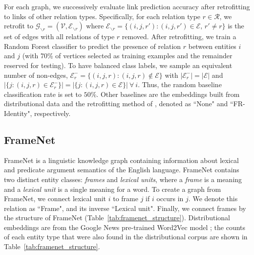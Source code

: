 \documentclass[11pt, a4paper]{article}
\begin{document}
For each graph, we successively evaluate link prediction accuracy after retrofitting to links of other relation types. Specifically, for each relation type $r\in\mathcal{R}$, we retrofit to $\mathcal{G}_{\backslash r} = (\mathcal{V},\mathcal{E}_{\backslash r})$ where $\mathcal{E}_{\backslash r}=\{(i,j,r'):(i,j,r')\in \mathcal{E} \text{, } r'\neq r\}$ is the set of edges with all relations of type $r$ removed. After retrofitting, we train a Random Forest classifier to predict the presence of relation $r$ between entities $i$ and $j$ (with 70\% of vertices selected as training examples and the remainder reserved for testing).  To have balanced class labels, we sample an equivalent number of non-edges, $\mathcal{E}^-_{r} = \{(i,j,r):(i,j,r)\notin \mathcal{E}\}$ with $|\mathcal{E}^-_{r}| = |\mathcal{E}|$ and
$|\{j : (i,j,r) \in \mathcal{E}^-_{r} \}| = |\{j : (i,j,r) \in \mathcal{E}\}|~\forall~i$.
Thus, the random baseline classification rate is set to $50\%$. Other baselines are the embeddings built from distributional data and the retrofitting method of , denoted as ``None" and ``FR-Identity", respectively. %


\subsection{FrameNet}
\label{sec:framenet_description}
FrameNet \cite{baker1998berkeley,fillmore2003background} is a linguistic knowledge graph containing information about lexical and predicate argument semantics of the English language.
FrameNet contains two distinct entity classes: \textit{frames} and \textit{lexical units}, where a \textit{frame} is a meaning and a \textit{lexical unit} is a single meaning for a word. %
To create a graph from FrameNet, we connect lexical unit $i$ to frame $j$ if $i$ occurs in $j$. We denote this relation as ``Frame", and its inverse ``Lexical unit".
Finally, we connect frames by the structure of FrameNet (Table~\ref{tab:framenet_structure}). Distributional embeddings are from the Google News pre-trained Word2Vec model \cite{mikolov2013distributed}%
; the counts of each entity type that were also found in the distributional corpus are shown in Table~\ref{tab:framenet_structure}.%
\end{document}
